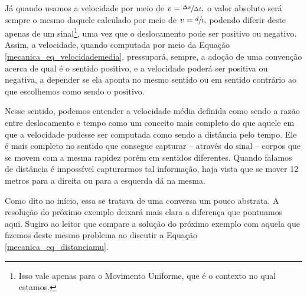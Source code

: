 Já quando usamos a velocidade por meio de $v=\sfrac{\Delta s}{\Delta t},$ o valor absoluto será sempre o mesmo daquele calculado por meio de $v=\sfrac{d}{t},$ podendo diferir deste apenas de um sinal\footnote{Isso vale apenas para o Movimento Uniforme, que é o contexto no qual estamos.}, uma vez que o deslocamento pode ser positivo ou negativo. Assim, a velocidade, quando computada por meio da Equação \eqref{mecanica_eq_velocidademedia}, pressuporá, sempre, a adoção de uma convenção acerca de qual é o sentido positivo, e a velocidade poderá ser positiva ou negativa, a depender se ela aponta no mesmo sentido ou em sentido contrário ao que escolhemos como sendo o positivo.

Nesse sentido, podemos entender a velocidade média definida como sendo a razão entre deslocamento e tempo como um conceito mais completo do que aquele em que a velocidade pudesse ser computada como sendo a distância pelo tempo. Ele é mais completo no sentido que consegue capturar -- através do sinal -- corpos que se movem com a mesma rapidez porém em sentidos diferentes. Quando falamos de distância é impossível capturarmos tal informação, haja vista que se mover 12 metros para a direita ou para a esquerda dá na mesma. 

Como dito no início, essa se tratava de uma conversa um pouco abstrata. A resolução do próximo exemplo deixará mais clara a diferença que pontuamos aqui. Sugiro ao leitor que compare a solução do próximo exemplo com aquela que fizemos deste mesmo problema ao discutir a Equação \eqref{mecanica_eq_distanciamu}.


\vspace{0.3cm}

